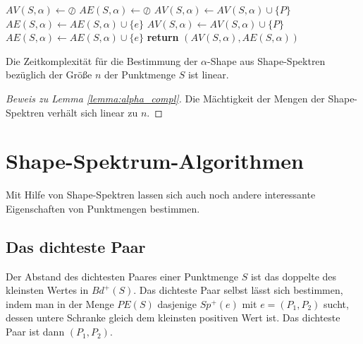 \begin{algorithm}\caption{Bestimmung der $\alpha$-Shape}\label{alg:shape}
\begin{algorithmic}[0]
	\State $AV(S,\alpha) \gets \oslash$
	\State $AE(S,\alpha) \gets \oslash$
				$AV(S,\alpha) \gets AV(S,\alpha) \cup \lbrace P \rbrace$
			\EndIf
		\EndFor
				$AE(S,\alpha) \gets AE(S,\alpha) \cup \lbrace e \rbrace$
			\EndIf
		\EndFor
				$AV(S,\alpha) \gets AV(S,\alpha) \cup \lbrace P \rbrace$
			\EndIf
		\EndFor
				$AE(S,\alpha) \gets AE(S,\alpha) \cup \lbrace e \rbrace$
			\EndIf
		\EndFor
	\EndIf	
	\State \textbf{return} $(AV(S,\alpha),AE(S,\alpha))$
\EndFunction
\end{algorithmic}
\end{algorithm}

\begin{lemma}\label{lemma:alpha_compl}
Die Zeitkomplexität für die Bestimmung der $\alpha$-Shape aus Shape-Spektren bezüglich der Größe $n$ der Punktmenge $S$ ist linear.
\end{lemma}

\begin{proof}[Beweis zu Lemma \ref{lemma:alpha_compl}]
Die Mächtigkeit der Mengen der Shape-Spektren verhält sich linear zu $n$.
\end{proof}

\section{Shape-Spektrum-Algorithmen}

Mit Hilfe von Shape-Spektren lassen sich auch noch andere interessante Eigenschaften von Punktmengen bestimmen.

\subsection*{Das dichteste Paar}
Der Abstand des dichtesten Paares einer Punktmenge $S$ ist das doppelte des kleinsten Wertes in $Bd^+(S)$. Das dichteste Paar selbst lässt sich bestimmen, indem man in der Menge $PE(S)$ dasjenige $Sp^+(e)$ mit $e=(P_1,P_2)$ sucht, dessen untere Schranke gleich dem kleinsten positiven Wert ist. Das dichteste Paar ist dann $(P_1,P_2)$.


